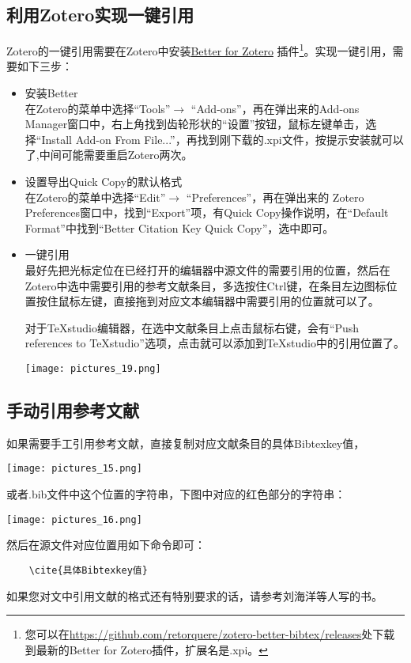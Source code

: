 \documentclass[cn,geye,cyan,normal,14pt]{elegantnote}
\begin{document}
\subsection{利用Zotero实现一键引用\cite{q_better_nodate}}
Zotero的一键引用需要在Zotero中安装\href{https://retorque.re/zotero-better-bibtex/}{Better \BibTeX{} for Zotero} 插件\footnote{您可以在\url{https://github.com/retorquere/zotero-better-bibtex/releases}处下载到最新的Better \BibTeX{} for Zotero插件，扩展名是.xpi。}。实现一键引用，需要如下三步：
\begin{itemize}
	\item 安装Better \BibTeX\\
		在Zotero的菜单中选择``Tools''$\to$ ``Add-ons''，再在弹出来的Add-ons Manager窗口中，右上角找到齿轮形状的``设置''按钮，鼠标左键单击，选择``Install Add-on From File...''，再找到刚下载的.xpi文件，按提示安装就可以了,中间可能需要重启Zotero两次。
	\item 设置导出Quick Copy的默认格式\\
		在Zotero的菜单中选择``Edit''$\to$ ``Preferences''，再在弹出来的 Zotero Preferences窗口中，找到``Export''项，有Quick Copy操作说明，在``Default Format''中找到``Better \BibTeX{} Citation Key Quick Copy''，选中即可。
	\item 一键引用\\
		最好先把光标定位在已经打开的编辑器中源文件的需要引用的位置，然后在Zotero中选中需要引用的参考文献条目，多选按住Ctrl键，在条目左边图标位置按住鼠标左键，直接拖到对应文本编辑器中需要引用的位置就可以了。
		\begin{note}
		对于\TeX studio编辑器，在选中文献条目上点击鼠标右键，会有``Push references to \TeX studio''选项，点击就可以添加到\TeX studio中的引用位置了。
			\begin{center}
			\texttt{[image: pictures\_19.png]}
			\end{center}
		\end{note}
\end{itemize}
\subsection{手动引用参考文献}
	如果需要手工引用参考文献，直接复制对应文献条目的具体Bibtexkey值，
			\begin{center}
			\texttt{[image: pictures\_15.png]}
			\end{center}
			或者.bib文件中这个位置的字符串，下图中对应的红色部分的字符串：
			\begin{center}
			\texttt{[image: pictures\_16.png]}
			\end{center}
	然后在源文件对应位置用如下命令即可：
	\begin{lstlisting}
	\cite{具体Bibtexkey值}
	\end{lstlisting}
\begin{note}
	如果您对文中引用文献的格式还有特别要求的话，请参考刘海洋等人写的书\cite{胡伟2013LATEX,刘海洋2013LATEX,陈志杰2006LATEX}。
\end{note}
\end{document}
